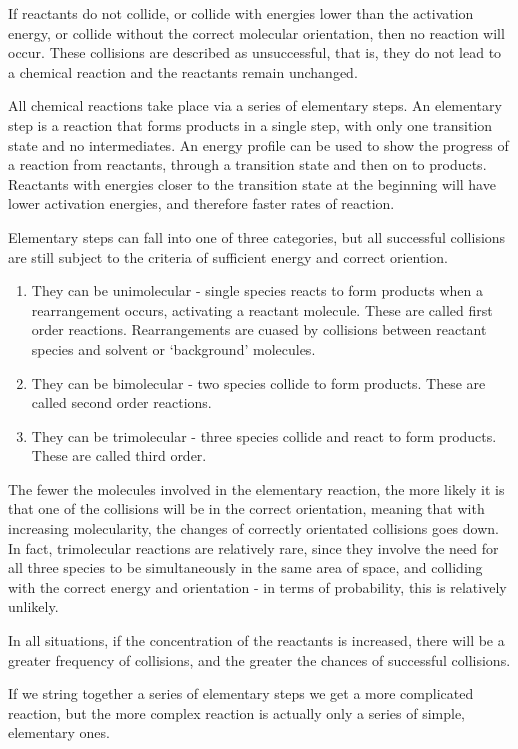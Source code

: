 \documentclass[../chem.tex]{subfiles}
\begin{document}
If reactants do not collide, or collide with energies lower than the activation energy, or collide without the correct molecular orientation, 
then no reaction will occur. These collisions are described as unsuccessful, that is, they do not lead to a chemical reaction and the reactants remain unchanged.

All chemical reactions take place via a series of elementary steps. An elementary step is a reaction that forms products in a single step, with only 
one transition state and no intermediates. An energy profile can be used to show the progress of a reaction from reactants, through a transition state and then 
on to products. Reactants with energies closer to the transition state at the beginning will have lower activation energies, and therefore faster rates of reaction.

Elementary steps can fall into one of three categories, but all successful collisions are still subject to the criteria of sufficient energy and correct oriention.
\begin{enumerate}
    \item They can be unimolecular - single species reacts to form products when a rearrangement occurs, activating a reactant molecule. These are called first order reactions. Rearrangements are cuased by collisions between reactant species and solvent or `background' molecules.
    \item They can be bimolecular - two species collide to form products. These are called second order reactions.
    \item They can be trimolecular - three species collide and react to form products. These are called third order.
\end{enumerate}

The fewer the molecules involved in the elementary reaction, the more likely it is that one of the collisions will be in the correct orientation, 
meaning that with increasing molecularity, the changes of correctly orientated collisions goes down. In fact, trimolecular reactions are 
relatively rare, since they involve the need for all three species to be simultaneously in the same area of space, and colliding with the correct energy 
and orientation - in terms of probability, this is relatively unlikely.

In all situations, if the concentration of the reactants is increased, there will be a greater frequency of collisions, and the greater the chances of successful collisions.

If we string together a series of elementary steps we get a more complicated reaction, but the more complex reaction is actually only a series 
of simple, elementary ones. 
\end{document}
